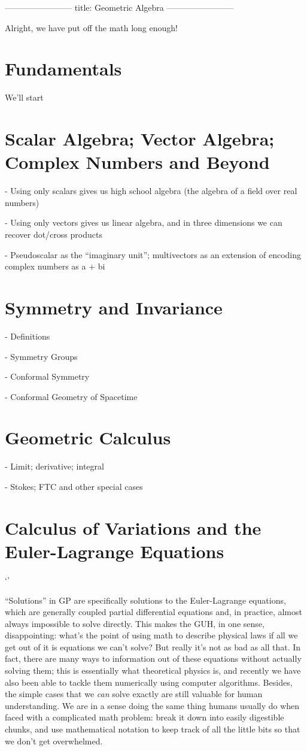 ------------------------
title: Geometric Algebra
------------------------

Alright, we have put off the math long enough!

\section{Fundamentals}

We'll start 

\section{Scalar Algebra; Vector Algebra; Complex Numbers and Beyond}

- Using only scalars gives us high school algebra (the algebra of a field over real numbers)

- Using only vectors gives us linear algebra, and in three dimensions we can recover dot/cross products

- Pseudoscalar as the ``imaginary unit''; multivectors as an extension of encoding complex numbers as a + bi

\section{Symmetry and Invariance}

- Definitions

- Symmetry Groups

- Conformal Symmetry

- Conformal Geometry of Spacetime

\section{Geometric Calculus}

- Limit; derivative; integral

- Stokes; FTC and other special cases

\section{Calculus of Variations and the Euler-Lagrange Equations}`'

``Solutions'' in GP are specifically solutions to the Euler-Lagrange equations, which are generally coupled partial differential equations and, in practice, almost always impossible to solve directly. This makes the GUH, in one sense, disappointing: what's the point of using math to describe physical laws if all we get out of it is equations we can't solve? But really it's not as bad as all that. In fact, there are many ways to information out of these equations without actually solving them; this is essentially what theoretical physics is, and recently we have also been able to tackle them numerically using computer algorithms. Besides, the simple cases that we \emph{can} solve exactly are still valuable for human understanding. We are in a sense doing the same thing humans usually do when faced with a complicated math problem: break it down into easily digestible chunks, and use mathematical notation to keep track of all the little bits so that we don't get overwhelmed.

